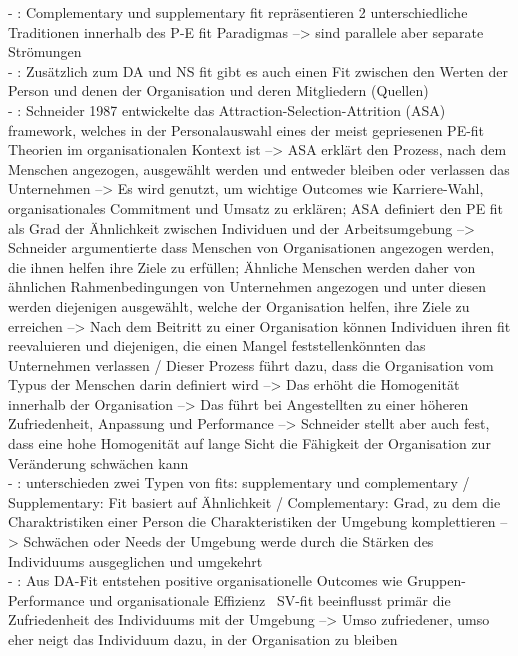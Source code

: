 - \cite[S. 1]{edwards:2004}: Complementary und supplementary fit repräsentieren 2 unterschiedliche Traditionen innerhalb des P-E fit Paradigmas --> sind parallele aber separate Strömungen \\
- \cite[S. 1]{edwards:2007}: Zusätzlich zum DA und NS fit gibt es auch einen Fit zwischen den Werten der Person und denen der Organisation und deren Mitgliedern (Quellen) \\
- \cite[S. 4]{su:2015}: Schneider 1987 entwickelte das Attraction-Selection-Attrition (ASA) framework, welches in der Personalauswahl eines der meist gepriesenen PE-fit Theorien im organisationalen Kontext ist --> ASA erklärt den Prozess, nach dem Menschen angezogen, ausgewählt werden und entweder bleiben oder verlassen das Unternehmen --> Es wird genutzt, um wichtige Outcomes wie Karriere-Wahl, organisationales Commitment und Umsatz zu erklären; ASA definiert den PE fit als Grad der Ähnlichkeit zwischen Individuen und der Arbeitsumgebung --> Schneider argumentierte dass Menschen von Organisationen angezogen werden, die ihnen helfen ihre Ziele zu erfüllen; Ähnliche Menschen werden daher von ähnlichen Rahmenbedingungen von Unternehmen angezogen und unter diesen werden diejenigen ausgewählt, welche der Organisation helfen, ihre Ziele zu erreichen --> Nach dem Beitritt zu einer Organisation können Individuen ihren fit reevaluieren und diejenigen, die einen Mangel feststellenkönnten das Unternehmen verlassen / Dieser Prozess führt dazu, dass die Organisation vom Typus der Menschen darin definiert wird --> Das erhöht die Homogenität innerhalb der Organisation --> Das führt bei Angestellten zu einer höheren Zufriedenheit, Anpassung und Performance --> Schneider stellt aber auch fest, dass eine hohe Homogenität auf lange Sicht die Fähigkeit der Organisation zur Veränderung schwächen kann \\
- \cite[S. 6]{su:2015}: \textcite{muchinsky:1987} unterschieden zwei Typen von fits: supplementary und complementary / Supplementary: Fit basiert auf Ähnlichkeit / Complementary: Grad, zu dem die Charaktristiken einer Person die Charakteristiken der Umgebung komplettieren --> Schwächen oder Needs der Umgebung werde durch die Stärken des Individuums ausgeglichen und umgekehrt \\
- \cite{su:2015}: Aus DA-Fit entstehen positive organisationelle Outcomes wie Gruppen-Performance und organisationale Effizienz \ SV-fit beeinflusst primär die Zufriedenheit des Individuums mit der Umgebung --> Umso zufriedener, umso eher neigt das Individuum dazu, in der Organisation zu bleiben


